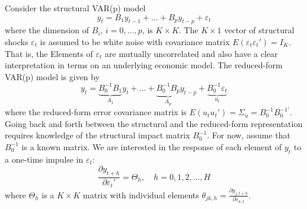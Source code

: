Consider the structural VAR(p) model $$y_t = B_1 y_{t-1} + ... + B_{p} y_{t-p} + \varepsilon_{t}$$
where the dimension of $B_i$, $i = 0,...,p$, is $K \times K$. The $K \times 1$ vector of structural shocks $\varepsilon_{t}$ is assumed to be white noise with covariance matrix $E(\varepsilon_t \varepsilon_t') = I_K$. That is, the Elements of $\varepsilon_t$ are mutually uncorrelated and also have a clear interpretation in terms on an underlying economic model. The reduced-form VAR(p) model is given by
$$y_t = \underbrace{B_0^{-1}B_1}_{A_1}y_t + ... + \underbrace{B_0^{-1}B_p}_{A_p} y_{t-p} + \underbrace{B_0^{-1}\varepsilon_t}_{u_t}$$
where the reduced-form error covariance matrix is $E(u_t u_t')=\Sigma_u = B_0^{-1}B_0^{-1'}$. Going back and forth between the structural and the reduced-form representation requires knowledge of the structural impact matrix $B_0^{-1}$. For now, assume that $B_0^{-1}$ is a known matrix. We are interested in the response of each element of $y_t$ to a one-time impulse in $\varepsilon_{t}$:
$$\frac{\partial y_{t+h}}{\partial \varepsilon_{t}'} = \Theta_h, \quad h=0,1,2,...,H$$
where $\Theta_h$ is a $K\times K$ matrix with individual elements $\theta_{jk,h}=\frac{\partial y_{j,t+h}}{\partial \varepsilon_{k,t}}$.
